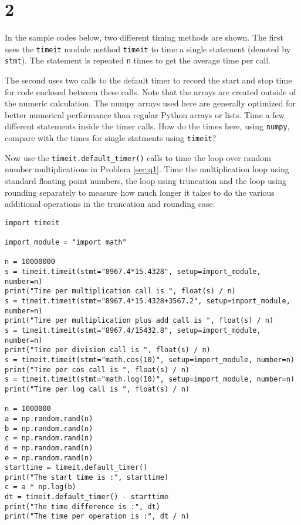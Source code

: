 \section{2}

In the sample codes below, two different timing methods are shown. The first uses the
\texttt{timeit} module method \texttt{timeit} to time a single statement (denoted by
\texttt{stmt}). The statement is repeated \texttt{n} times to get the average time per call.

The second uses two calls to the default timer to record the start and stop time for code
enclosed between these calls. Note that the arrays are created outside of the numeric
calculation. The numpy arrays used here are generally optimized for better numerical
performance than regular Python arrays or lists. Time a few different statements inside the
timer calls. How do the times here, using \texttt{numpy}, compare with the times for single
statments using \texttt{timeit}?

Now use the \texttt{timeit.default\_timer()} calls to time the loop over random number
multiplications in Problem \ref{sec:q1}. Time the multiplication loop using standard
floating point numbers, the loop using truncation and the loop using rounding separately to
measure how much longer it takes to do the various additional operations in the truncation
and rounding case.

\begin{verbatim}
import timeit

import_module = "import math"

n = 10000000
s = timeit.timeit(stmt="8967.4*15.4328", setup=import_module, number=n)
print("Time per multiplication call is ", float(s) / n)
s = timeit.timeit(stmt="8967.4*15.4328+3567.2", setup=import_module, number=n)
print("Time per multiplication plus add call is ", float(s) / n)
s = timeit.timeit(stmt="8967.4/15432.8", setup=import_module, number=n)
print("Time per division call is ", float(s) / n)
s = timeit.timeit(stmt="math.cos(10)", setup=import_module, number=n)
print("Time per cos call is ", float(s) / n)
s = timeit.timeit(stmt="math.log(10)", setup=import_module, number=n)
print("Time per log call is ", float(s) / n)

n = 1000000
a = np.random.rand(n)
b = np.random.rand(n)
c = np.random.rand(n)
d = np.random.rand(n)
e = np.random.rand(n)
starttime = timeit.default_timer()
print("The start time is :", starttime)
c = a * np.log(b)
dt = timeit.default_timer() - starttime
print("The time difference is :", dt)
print("The time per operation is :", dt / n)
\end{verbatim}
